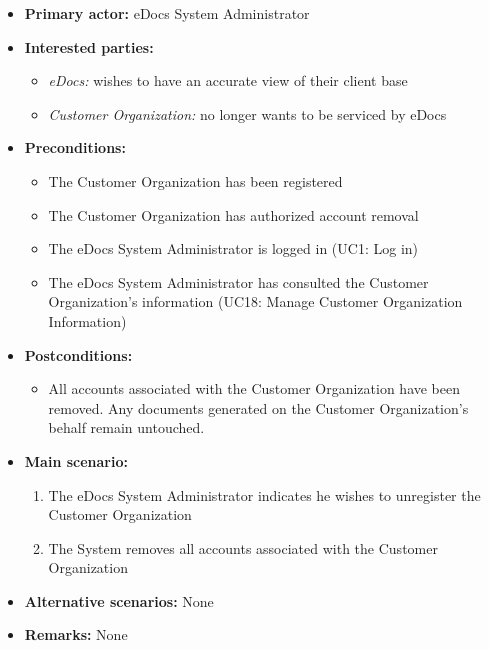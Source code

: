 \documentclass[a4paper,10pt]{article}
\begin{document}
\begin{itemize}
	\item \textbf{Primary actor:} eDocs System Administrator
	\item \textbf{Interested parties:} 
	\begin{itemize}
		\item \textit{eDocs:} wishes to have an accurate view of their client base
		\item \textit{Customer Organization:} no longer wants to be serviced by eDocs
	\end{itemize}
	
	\item \textbf{Preconditions:}
	\begin{itemize}
		\item The Customer Organization has been registered
		\item The Customer Organization has authorized account removal
		\item The eDocs System Administrator is logged in (UC1: Log in)
		\item The eDocs System Administrator has consulted the Customer Organization's information (UC18: Manage Customer Organization Information)
	\end{itemize}
	
	\item \textbf{Postconditions:}
	\begin{itemize}
		\item All accounts associated with the Customer Organization have been removed. Any documents generated on the Customer Organization's behalf remain untouched.
	\end{itemize}
	
	\item \textbf{Main scenario:} 
	\begin{enumerate}
		\item The eDocs System Administrator indicates he wishes to unregister the Customer Organization
		\item The System removes all accounts associated with the Customer Organization
	\end{enumerate}
	
	\item \textbf{Alternative scenarios:} 
	None
	
	\item \textbf{Remarks:}
	None
\end{itemize}
\end{document}

